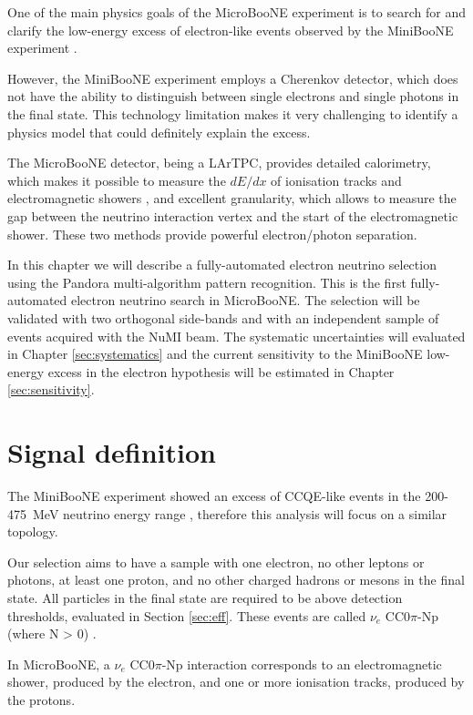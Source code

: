 One of the main physics goals of the MicroBooNE experiment is to search for and clarify the low-energy excess of electron-like events observed by the MiniBooNE experiment \cite{Aguilar-Arevalo:2018gpe}. 

However, the MiniBooNE experiment employs a Cherenkov detector, which does not have the ability to distinguish between single electrons and single photons in the final state. This technology limitation makes it very challenging to identify a physics model that could definitely explain the excess.

The MicroBooNE detector, being a LArTPC, provides detailed  calorimetry, which makes it possible to measure the $dE/dx$ of ionisation tracks and electromagnetic showers \cite{Acciarri:2016sli}, and excellent granularity, which allows to measure the gap between the neutrino interaction vertex and the start of the electromagnetic shower. These two methods provide powerful electron/photon separation.%

In this chapter we will describe a fully-automated electron neutrino selection using the Pandora multi-algorithm pattern recognition. This is the first fully-automated electron neutrino search in MicroBooNE. The selection will be validated with two orthogonal side-bands and with an independent sample of events acquired with the NuMI beam. The systematic uncertainties will evaluated in Chapter \ref{sec:systematics} and the current sensitivity to the MiniBooNE low-energy excess in the electron hypothesis will be estimated in Chapter \ref{sec:sensitivity}.

\section{Signal definition}
The MiniBooNE experiment showed an excess of CCQE-like events in the 200-475~MeV neutrino energy range \cite{Aguilar-Arevalo:2018gpe}, therefore this analysis will focus on a similar topology.

Our selection aims to have a sample with one electron, no other leptons or photons, at least one proton, and no other charged hadrons or mesons in the final state. All particles in the final state are required to be above detection thresholds, evaluated in Section \ref{sec:eff}. These events are called $\nu_{e}$ CC0$\pi$-Np (where N > 0) \cite{Katori:2013nca}. 

In MicroBooNE, a $\nu_{e}$ CC0$\pi$-Np interaction corresponds to an electromagnetic shower, produced by the electron, and one or more ionisation tracks, produced by the protons.

